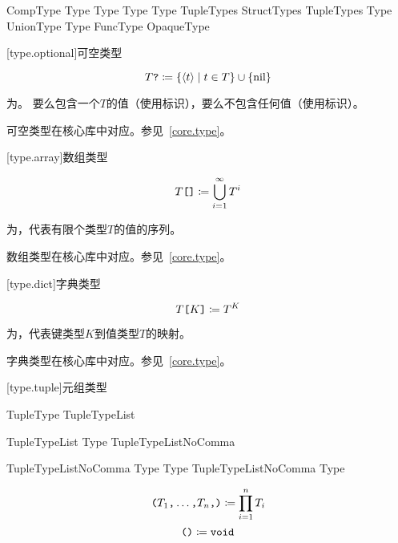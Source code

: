 \begin{bnf}{CompType}
    Type  \br
    Type \terminal{[} \terminal{]} \br
    Type \terminal{[} Type \terminal{]} \br
    \terminal{(} TupleTypes\bnfs \terminal{)} \br
    \terminal{\{} StructTypes \terminal{\}} \br
    \terminal{(} TupleTypes\bnfs \terminal{)} \terminal{->} Type \br
    UnionType \br
    Type \terminal{\&} \br
    FuncType \br
    OpaqueType
\end{bnf}

[type.optional]{可空类型}

$$ T\texttt{?} \coloneqq \{ \langle t \rangle \mid t \in T \} \cup \{ \mathrm{nil} \} $$

\pnum
{}为。
要么包含一个$T$的值（使用标识），要么不包含任何值（使用标识）。

\pnum
可空类型在核心库中对应。参见~\ref{core.type}。

[type.array]{数组类型}

$$ T\texttt{[]} \coloneqq \bigcup^\infty_{i=1} T^i $$

\pnum
{}为，代表有限个类型$T$的值的序列。

\pnum
数组类型在核心库中对应。参见~\ref{core.type}。

[type.dict]{字典类型}

$$ T\texttt{[}K\texttt{]} \coloneqq T^K $$

\pnum
{}为，代表键类型$K$到值类型$T$的映射。

\pnum
字典类型在核心库中对应。参见~\ref{core.type}。

[type.tuple]{元组类型}

\begin{bnf}{TupleType}
    \terminal{(} TupleTypeList \terminal{)}
\end{bnf}

\begin{bnf}{TupleTypeList}
    Type \terminal{,} \br
    TupleTypeListNoComma \terminal{,}\bnfq
\end{bnf}

\begin{bnf}{TupleTypeListNoComma}
    Type \terminal{,} Type \br
    TupleTypeListNoComma \terminal{,} Type
\end{bnf}

$$ \texttt{(}T_1\texttt{,} \ldots\texttt{,} T_n\texttt{,}\texttt{)} \coloneqq \prod^n_{i=1} T_i $$
$$ \texttt{()} \coloneqq \texttt{void} $$

